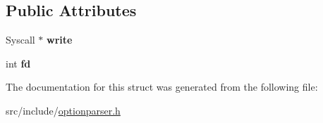 \subsection*{Public Attributes}
\begin{DoxyCompactItemize}
\item 
\hypertarget{structxmem_1_1config_1_1third__party_1_1_print_usage_implementation_1_1_syscall_writer_a437e8105a1e0b45e514246caed539664}{Syscall $\ast$ {\bfseries write}}\label{structxmem_1_1config_1_1third__party_1_1_print_usage_implementation_1_1_syscall_writer_a437e8105a1e0b45e514246caed539664}

\item 
\hypertarget{structxmem_1_1config_1_1third__party_1_1_print_usage_implementation_1_1_syscall_writer_a9652df23c84135075bb5468bb39a7064}{int {\bfseries fd}}\label{structxmem_1_1config_1_1third__party_1_1_print_usage_implementation_1_1_syscall_writer_a9652df23c84135075bb5468bb39a7064}

\end{DoxyCompactItemize}


The documentation for this struct was generated from the following file\-:\begin{DoxyCompactItemize}
\item 
src/include/\hyperlink{optionparser_8h}{optionparser.\-h}\end{DoxyCompactItemize}
